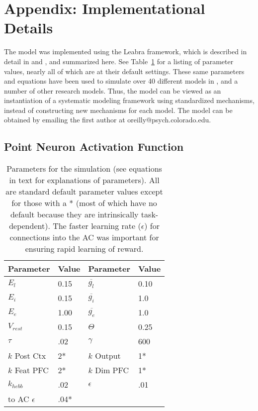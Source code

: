 \section{Appendix: Implementational Details}

The model was implemented using the Leabra framework, which is
described in detail in  and
, and summarized here.  See
Table~\ref{tab.sim_params} for a listing of parameter values, nearly
all of which are at their default settings.  These same parameters and
equations have been used to simulate over 40 different models in
, and a number of other research models.
Thus, the model can be viewed as an instantiation of a systematic
modeling framework using standardized mechanisms, instead of
constructing new mechanisms for each model.  The model can be obtained
by emailing the first author at oreilly@psych.colorado.edu.

\subsection{Point Neuron Activation Function} 

\begin{table}
  \centering
  \begin{tabular}{ll|ll} \hline
Parameter & Value & Parameter & Value \\ \hline
$E_l$ & 0.15 & $\overline{g_l}$ & 0.10 \\
$E_i$ & 0.15 & $\overline{g_i}$ & 1.0 \\
$E_e$ & 1.00 & $\overline{g_e}$ & 1.0 \\
$V_{rest}$ & 0.15 & $\Theta$    & 0.25 \\
$\tau$ & .02 & $\gamma$ & 600 \\
$k$ Post Ctx & 2* & $k$ Output  & 1* \\
$k$ Feat PFC & 2* & $k$ Dim PFC & 1* \\
$k_{hebb}$ & .02 & $\epsilon$ & .01 \\
to AC $\epsilon$ & .04* & \\ \hline
  \end{tabular}
  \caption{\small Parameters for the simulation (see equations in text
    for explanations of parameters).  All are standard
    default parameter values except for those with a * (most of which
    have no default because they are intrinsically task-dependent).
    The faster learning rate ($\epsilon$) for connections into the AC
    was important for ensuring rapid learning of reward.}
  \label{tab.sim_params}
\end{table}


